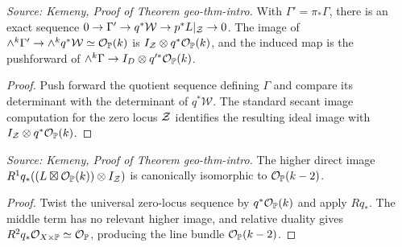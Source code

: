\begin{lemma}
  \label{lem:kemeny_gamma_prime_image}
  \textit{Source: Kemeny, Proof of Theorem geo-thm-intro.}
  With \(\Gamma'=\pi_*\Gamma\), there is an exact sequence
  \(0\to\Gamma'\to q^*\mathcal W\to p^*L|_{\mathcal{Z}}\to0\).  The image of
  \(\wedge^k\Gamma'\to\wedge^kq^*\mathcal W\simeq\mathcal{O}_{\mathbb{P}}(k)\) is
  \(I_{\mathcal{Z}}\otimes q^*\mathcal{O}_{\mathbb{P}}(k)\), and the induced map is the pushforward of
  \(\wedge^k\Gamma\to I_D\otimes q'^*\mathcal{O}_{\mathbb{P}}(k)\).
\end{lemma}
\begin{proof}
  Push forward the quotient sequence defining \(\Gamma\) and compare its
  determinant with the determinant of \(q^*\mathcal W\).  The standard secant
  image computation for the zero locus \(\mathcal{Z}\) identifies the resulting ideal
  image with \(I_{\mathcal{Z}}\otimes q^*\mathcal{O}_{\mathbb{P}}(k)\).
\end{proof}

\begin{lemma}
  \label{lem:kemeny_R1q_line_bundle}
  \textit{Source: Kemeny, Proof of Theorem geo-thm-intro.}
  The higher direct image
  \(R^1q_*((L\boxtimes\mathcal{O}_{\mathbb{P}}(k))\otimes I_{\mathcal{Z}})\) is canonically
  isomorphic to \(\mathcal{O}_{\mathbb{P}}(k-2)\).
\end{lemma}
\begin{proof}
  Twist the universal zero-locus sequence by \(q^*\mathcal{O}_{\mathbb{P}}(k)\) and apply
  \(Rq_*\).  The middle term has no relevant higher image, and relative duality
  gives \(R^2q_*\mathcal{O}_{X\times\mathbb{P}}\simeq\mathcal{O}_{\mathbb{P}}\), producing the line bundle
  \(\mathcal{O}_{\mathbb{P}}(k-2)\).
\end{proof}

